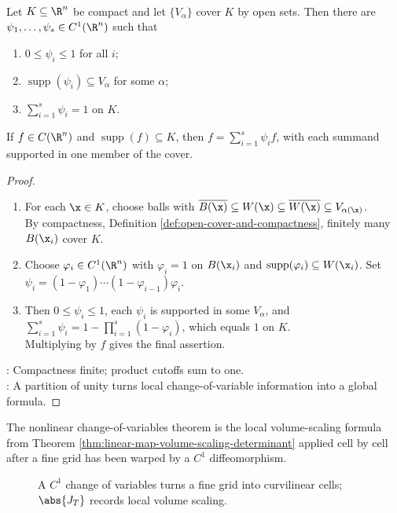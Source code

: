 \begin{theorem} \label{thm:partition-of-unity-rudin} \\
Let $K\subseteq\R^n$ be compact and let $\{V_\alpha\}$ cover $K$ by open sets. Then there are $\psi_1,\ldots,\psi_s\in C^1(\R^n)$ such that
\begin{enumerate}[label=(\roman*)]
\setlength{\itemsep}{0pt}
\item $0\leq\psi_i\leq1$ for all $i$;
\item $\operatorname{supp}(\psi_i)\subseteq V_\alpha$ for some $\alpha$;
\item $\sum_{i=1}^s\psi_i=1$ on $K$.
\end{enumerate}
If $f\in C(\R^n)$ and $\operatorname{supp}(f)\subseteq K$, then $f=\sum_{i=1}^{s}\psi_if$, with each summand supported in one member of the cover.
\begin{proof}
\begin{enumerate}[label=(\roman*)]
\setlength{\itemsep}{0pt}
\item For each $\x\in K$, choose balls with $\overline{B(\x)}\subseteq W(\x)\subseteq\overline{W(\x)}\subseteq V_{\alpha(\x)}$.\\
By compactness, Definition \ref{def:open-cover-and-compactness}, finitely many $B(\x_i)$ cover $K$.
\item Choose $\varphi_i\in C^1(\R^n)$ with $\varphi_i=1$ on $B(\x_i)$ and $\operatorname{supp}(\varphi_i)\subseteq W(\x_i)$. Set $\psi_i=(1-\varphi_1)\cdots(1-\varphi_{i-1})\varphi_i$.
\item Then $0\leq\psi_i\leq1$, each $\psi_i$ is supported in some $V_\alpha$, and $\sum\limits_{i=1}^{s}\psi_i=1-\prod\limits_{i=1}^{s}(1-\varphi_i)$, which equals $1$ on $K$.\\
Multiplying by $f$ gives the final assertion.
\end{enumerate}
: Compactness finite; product cutoffs sum to one.\\
: A partition of unity turns local change-of-variable information into a global formula.
\end{proof}
\end{theorem}

The nonlinear change-of-variables theorem is the local volume-scaling formula from Theorem \ref{thm:linear-map-volume-scaling-determinant} applied cell by cell after a fine grid has been warped by a $C^1$ diffeomorphism.

\begin{figure}[H]
  \centering
  
  \caption{A $C^1$ change of variables turns a fine grid into curvilinear cells; $\abs{J_T}$ records local volume scaling.}
  \label{fig:change-of-variables-grid-warp}
\end{figure}


